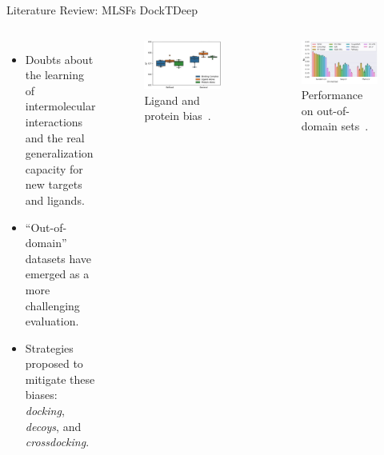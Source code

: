 \documentclass[aspectratio=169,xcolor=dvipsnames]{beamer}
\begin{document}
\begin{frame}{Literature Review: MLSFs \hfill {\footnotesize \alert{DockTDeep}}}
    \begin{columns}[t]
        \begin{itemize}
            \item Doubts about the learning of intermolecular interactions and the real \alert{generalization capacity} for new targets and ligands.
            \item ``Out-of-domain'' datasets have emerged as a more challenging evaluation.
            \item Strategies proposed to mitigate these biases: \textit{docking}, \textit{decoys}, and \textit{crossdocking}.
        \end{itemize}

        \vspace{-1em}
        \begin{figure}
            \centering
            \includegraphics[width=0.5\linewidth]{imgs/protein-ligand-bias.png}
            \vspace{-0.5em}
            \caption{Ligand and protein bias~\cite{yang2020predicting}.}
        \end{figure}
        \vspace{-1em}
        \begin{figure}
            \centering
            \includegraphics[width=0.6\linewidth]{imgs/pfam-cv.png}
            \vspace{-0.5em}
            \caption{Performance on out-of-domain sets~\cite{zhu2022assessment}.}
        \end{figure}

    \end{columns}
\end{frame}
\end{document}
